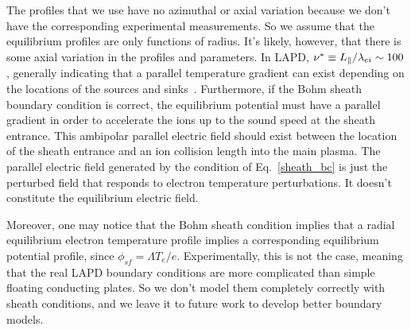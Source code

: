 The profiles that we use have no azimuthal or axial variation because we don't have the corresponding experimental measurements. So we assume that the equilibrium profiles are only functions
of radius. It's likely, however, that there is some axial variation in the profiles and parameters. In LAPD, $\nu^* \equiv L_\parallel/\lambda_{ei} \sim 100$, generally indicating that a
parallel temperature gradient can exist depending on the locations of the sources and sinks~\cite{stangeby2000}. 
Furthermore, if the Bohm sheath boundary condition is correct, the equilibrium potential must have a parallel gradient in order
to accelerate the ions up to the sound speed at the sheath entrance. This ambipolar parallel electric field should exist between the location of the sheath entrance and an ion collision length
into the main plasma. The parallel electric field generated by the condition of Eq.~\ref{sheath_bc} is just the perturbed field that responds to electron temperature perturbations. It doesn't
constitute the equilibrium electric field. 

Moreover, one may notice that the Bohm sheath condition implies that a radial equilibrium electron temperature profile implies a corresponding equilibrium potential profile, since 
$\phi_{sf} = \Lambda T_e / e$. Experimentally, this is not the case, meaning that the real LAPD boundary conditions are more complicated than simple floating conducting plates. So we don't
model them completely correctly with sheath conditions, and we leave it to future work to develop better boundary models.




